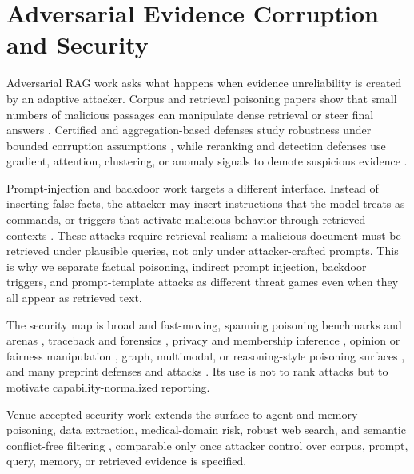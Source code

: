 \section{Adversarial Evidence Corruption and Security}

Adversarial RAG work asks what happens when evidence unreliability is created by an adaptive attacker. Corpus and retrieval poisoning papers show that small numbers of malicious passages can manipulate dense retrieval or steer final answers \citep{poisoningRetrievalCorpora2023,poisonedRAG2024,badRAG2024,rrag049,rrag057}. Certified and aggregation-based defenses study robustness under bounded corruption assumptions \citep{certifiedRAG2024,rrag016,rrag020}, while reranking and detection defenses use gradient, attention, clustering, or anomaly signals to demote suspicious evidence \citep{rrag004,rrag009,rrag011,rrag015,rrag017}.

Prompt-injection and backdoor work targets a different interface. Instead of inserting false facts, the attacker may insert instructions that the model treats as commands, or triggers that activate malicious behavior through retrieved contexts \citep{aip2025,rrag005,trojanRAG2024,phantom2024,rrag010,rrag018}. These attacks require retrieval realism: a malicious document must be retrieved under plausible queries, not only under attacker-crafted prompts. This is why we separate factual poisoning, indirect prompt injection, backdoor triggers, and prompt-template attacks as different threat games even when they all appear as retrieved text.

The security map is broad and fast-moving, spanning poisoning benchmarks and arenas \citep{rrag019,rrag023,rrag033,rrag035}, traceback and forensics \citep{rrag014,rrag128}, privacy and membership inference \citep{rrag060,rrag063,rrag096,rrag103}, opinion or fairness manipulation \citep{rrag104,rrag162}, graph, multimodal, or reasoning-style poisoning surfaces \citep{rrag051,rrag127,rrag175}, and many preprint defenses and attacks \citep{rrag022,rrag025,rrag047,rrag052,rrag068,rrag097,rrag114,rrag126,rrag149,rrag177,rrag197,rrag221}. Its use is not to rank attacks but to motivate capability-normalized reporting.

Venue-accepted security work extends the surface to agent and memory poisoning, data extraction, medical-domain risk, robust web search, and semantic conflict-free filtering \citep{rrag053,rrag090,rrag021,rrag017,venueAcc014}, comparable only once attacker control over corpus, prompt, query, memory, or retrieved evidence is specified.

